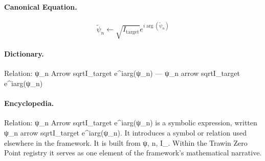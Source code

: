 \paragraph{Canonical Equation.}
\[
\tilde{\psi}_n \leftarrow \sqrt{I_{\text{target}}} e^{i\arg(\tilde{\psi}_n)}
\]

\paragraph{Dictionary.}
Relation: ψ\_n Arrow sqrtI\_target e\textasciicircum{}iarg(ψ\_n) — ψ\_n arrow sqrtI\_target e\textasciicircum{}iarg(ψ\_n)

\paragraph{Encyclopedia.}
Relation: ψ\_n Arrow sqrtI\_target e\textasciicircum{}iarg(ψ\_n) is a symbolic expression, written ψ\_n arrow sqrtI\_target e\textasciicircum{}iarg(ψ\_n). It introduces a symbol or relation used elsewhere in the framework. It is built from ψ, n, I\_. Within the Trawin Zero Point registry it serves as one element of the framework's mathematical narrative.
